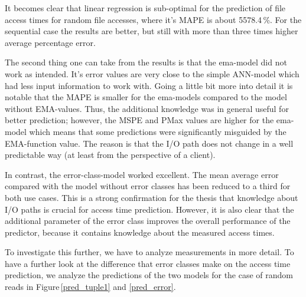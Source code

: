 \documentclass{superfri}
\begin{document}
	It becomes clear that linear regression is sub-optimal for the prediction of file access times for random file accesses, where it's MAPE is about 5578.4\,\%. For the sequential case the results are better, but still with more than three times higher average percentage error.\medskip
	
	The second thing one can take from the results is that the ema-model did not work as intended.
	It's error values are very close to the simple ANN-model which had less input information to work with.
	Going a little bit more into detail it is notable that the MAPE is smaller for the ema-models compared to the model without EMA-values.
	Thus, the additional knowledge was in general useful for better prediction; however, the MSPE and PMax values are higher for the ema-model which means that some predictions were significantly misguided by the EMA-function value.
	The reason is that the I/O path does not change in a well predictable way (at least from the perspective of a client).
	\medskip
	
	In contrast, the error-class-model worked excellent. The mean average error compared with the model without error classes has been reduced to a third for both use cases.
	This is a strong confirmation for the thesis that knowledge about I/O paths is crucial for access time prediction.
	However, it is also clear that the additional parameter of the error class improves the overall performance of the predictor, because it contains knowledge about the measured access times.
	
	\medskip
	
	To investigate this further, we have to analyze measurements in more detail.
	To have a further look at the difference that error classes make on the access time prediction, we analyze the predictions of the two models for the case of random reads in Figure\,\ref{pred_tuple1} and \ref{pred_error}.
\end{document}
